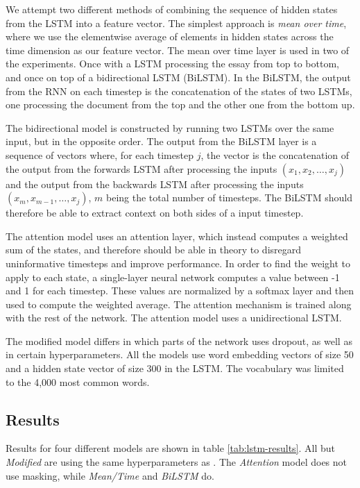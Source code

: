 We attempt two different methods of combining the sequence of hidden states
from the \ac{LSTM} into a feature vector. The simplest approach is \emph{mean
over time}, where we use the elementwise average of elements in hidden states
across the time dimension as our feature vector. The mean over time layer is
used in two of the experiments. Once with a \ac{LSTM} processing the essay
from top to bottom, and once on top of a bidirectional LSTM (BiLSTM). In the
BiLSTM, the output from the \ac{RNN} on each timestep is the concatenation of
the states of two \acp{LSTM}, one processing the document from the top and
the other one from the bottom up.

 The bidirectional model is constructed by
running two \acp{LSTM} over the same input, but in the opposite order. The
output from the BiLSTM layer is a sequence of vectors where, for each
timestep $j$, the vector is the concatenation of the output from the forwards
\ac{LSTM} after processing the inputs $(x_1, x_2, \ldots, x_j)$ and the
output from the backwards \ac{LSTM} after processing the inputs $(x_m,
x_{m-1}, \ldots, x_j)$, $m$ being the total number of timesteps. The BiLSTM
should therefore be able to extract context on both sides of a input
timestep.


The attention model uses an attention layer, which instead computes a
weighted sum of the states, and therefore should be able in theory to
disregard uninformative timesteps and improve performance. In order to find
the weight to apply to each state, a single-layer neural network computes a
value between -1 and 1 for each timestep. These values are normalized by a
softmax layer and then used to compute the weighted average. The attention
mechanism is trained along with the rest of the network. The attention model
uses a unidirectional \ac{LSTM}.

The modified model differs in which parts of the network uses dropout, as
well as in certain hyperparameters. All the models use word embedding vectors
of size 50 and a hidden state vector of size 300 in the \ac{LSTM}. The
vocabulary was limited to the 4,000 most common words.


\subsection{Results}

Results for four different models are shown in table \ref{tab:lstm-results}. All
but \emph{Modified} are using the same hyperparameters as
\citeauthor{taghipour16}. The \emph{Attention} model does not use masking,
while \emph{Mean/Time} and \emph{BiLSTM} do.

